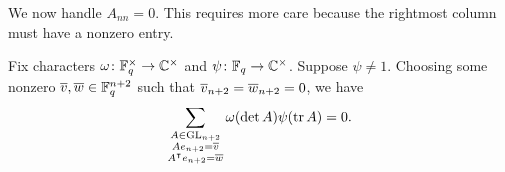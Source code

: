 We now handle $A_{nn}=0$. This requires more care because the rightmost column must have a nonzero entry.
\begin{lemma} \label{lem:gsum-gl-0}
    Fix characters $\omega\colon\mathbb F_q^\times\to\mathbb C^\times$ and $\psi\colon\mathbb F_q\to\mathbb C^\times$. Suppose $\psi \neq 1$. Choosing some nonzero $\overline{v},\overline{w}\in\mathbb F_q^{n+2}$ such that $\overline{v}_{n+2}=\overline{w}_{n+2}=0$, we have
    \[\sum_{\substack{A\in\mathrm{GL}_{n+2}\\Ae_{n+2}=\overline{v}\\A^\intercal e_{n+2}=\overline{w}}}\omega(\det A)\psi(\operatorname{tr} A)=0.\]
\end{lemma}
